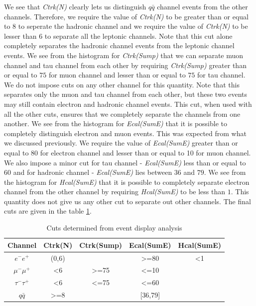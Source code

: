 We see that \textit{Ctrk(N)} clearly lets us distinguish $q\bar{q}$ channel events from the other channels. Therefore, we require the value of \textit{Ctrk(N)} to be greater than or equal to $8$ to seperate the hadronic channel and we require the value of \textit{Ctrk(N)} to be lesser than $6$ to separate all the leptonic channels. Note that this cut alone completely separates the hadronic channel events from the leptonic channel events. We see from the histogram for \textit{Ctrk(Sump)} that we can separate muon channel and tau channel from each other by requiring \textit{Ctrk(Sump)} greater than or equal to $75$ for muon channel and lesser than or equal to $75$ for tau channel. We do not impose cuts on any other channel for this quantity. Note that this separates only the muon and tau channel from each other, but these two events may still contain electron and hadronic channel events. This cut, when used with all the other cuts, ensures that we completely separate the channels from one another. We see from the histogram for \textit{Ecal(SumE)} that it is possible to completely distinguish electron and muon events. This was expected from what we discussed previously. We require the value of \textit{Ecal(SumE)} greater than or equal to $80$ for electron channel and lesser than or equal to 10 for muon channel. We also impose a minor cut for tau channel - \textit{Ecal(SumE)} less than or equal to 60 and for hadronic channel - \textit{Ecal(SumE)} lies between $36$ and $79$. We see from the histogram for \textit{Hcal(SumE)} that it is possible to completely separate electron channel from the other channel by requiring \textit{Hcal(SumE)} to be less than $1$. This quantity does not give us any other cut to separate out other channels. The final cuts are given in the table \ref{table:cuts}.\\
\begin{table}[h!]
\centering
\begin{tabular}{c|cccc}
\hline
Channel        & Ctrk(N)          & Ctrk(Sump)        & Ecal(SumE)        & Hcal(SumE)   \\
\hline
$e^-e^+$       & (0,6)            &                   & \textgreater{}=80 & \textless{}1 \\
$\mu^-\mu^+$   & \textless{}6     & \textgreater{}=75 & \textless{}=10    &              \\
$\tau^-\tau^+$ & \textless{}6     & \textless{}=75    & \textless{}=60    &              \\
$q\bar{q}$     & \textgreater{}=8 &                   & {[}36,79{]}       &             \\ \hline
\end{tabular}
\caption{Cuts determined from event display analysis}
\label{table:cuts}
\end{table}
